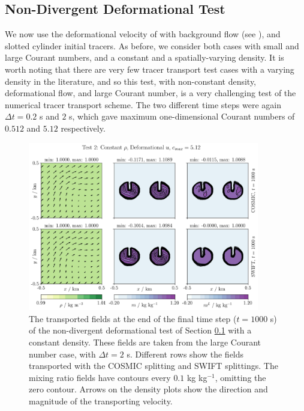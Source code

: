 \documentclass[11pt,a4paper]{article}
\begin{document}
\subsection{Non-Divergent Deformational Test} \label{sec:test2}
We now use the deformational velocity of \cite{skamarock2006limiters} with background flow (see \citet{kent2020positive}), and slotted cylinder initial tracers. As before, we consider both cases with small and large Courant numbers, and a constant and a spatially-varying density. It is worth noting that there are very few tracer transport test cases with a varying density in the literature, and so this test, with non-constant density, deformational flow, and large Courant number, is a very challenging test of the numerical tracer transport scheme. 
The two different time steps were again $\Delta t=0.2$ s and $2$ s, which gave maximum one-dimensional Courant numbers of $0.512$ and $5.12$ respectively. \\
\begin{figure}[ht!]
\centering
\includegraphics[width=0.9\textwidth]{fig_3_deformational.jpg}
\caption{The transported fields at the end of the final time step ($t=1000$ s) of the non-divergent deformational test of Section \ref{sec:test2} with a constant density. These fields are taken from the large Courant number case, with $\Delta t=2$ s. Different rows show the fields transported with the COSMIC splitting and SWIFT splittings.
The mixing ratio fields have contours every $0.1$ kg kg$^{-1}$, omitting the zero contour.
Arrows on the density plots show the direction and magnitude of the transporting velocity.}\label{fig:test2constrho}
\end{figure} \\
\\
\end{document}
